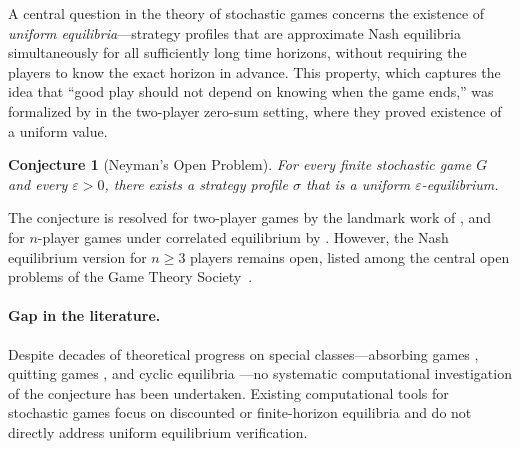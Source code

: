 \documentclass[11pt,a4paper]{article}
\newtheorem{conjecture}[theorem]{Conjecture}
\theoremstyle{definition}
\newcommand{\eps}{\varepsilon}
\begin{document}
A central question in the theory of stochastic games concerns the existence of \emph{uniform equilibria}---strategy profiles that are approximate Nash equilibria simultaneously for all sufficiently long time horizons, without requiring the players to know the exact horizon in advance.
This property, which captures the idea that ``good play should not depend on knowing when the game ends,'' was formalized by \citet{mertens1981stochastic} in the two-player zero-sum setting, where they proved existence of a uniform value.

\begin{conjecture}[Neyman's Open Problem]
For every finite stochastic game $G$ and every $\eps > 0$, there exists a strategy profile $\sigma$ that is a uniform $\eps$-equilibrium.
\end{conjecture}

The conjecture is resolved for two-player games by the landmark work of \citet{vieille2000a,vieille2000b}, and for $n$-player games under correlated equilibrium by \citet{solan2002correlated}.
However, the Nash equilibrium version for $n \geq 3$ players remains open, listed among the central open problems of the Game Theory Society~\citep{neyman2003minmax,solan2015stochastic}.

\paragraph{Gap in the literature.}
Despite decades of theoretical progress on special classes---absorbing games \citep{solan1999three}, quitting games \citep{solan2001quitting}, and cyclic equilibria \citep{flesch1997cyclic}---no systematic computational investigation of the conjecture has been undertaken.
Existing computational tools for stochastic games \citep{gambit2025,knight2018nashpy,eibelshaeuser2022sgamesolver} focus on discounted or finite-horizon equilibria and do not directly address uniform equilibrium verification.
\end{document}

